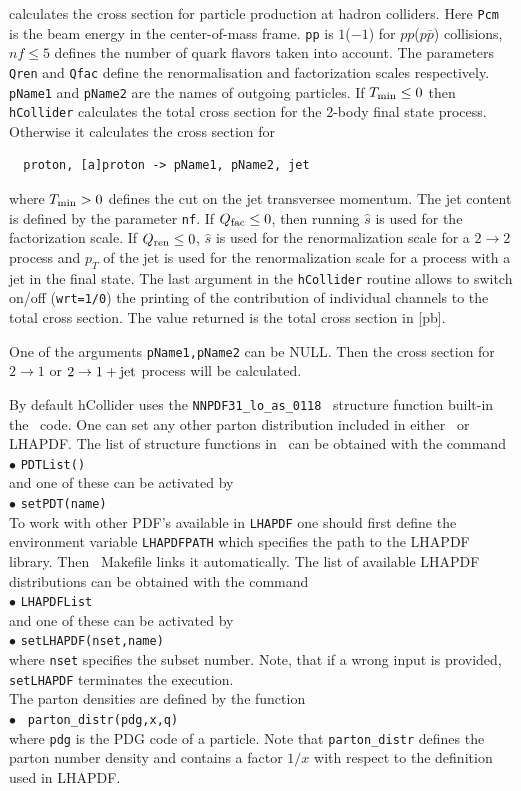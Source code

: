 \documentclass[12pt,a4paper]{article}
\begin{document}
calculates the cross
section for particle production at hadron colliders. Here \verb|Pcm| 
is the beam energy  in the center-of-mass frame. \verb|pp| is
$1$($-1$) for $pp$($p\bar{p}$) collisions, $ nf \le 5$  defines the
number of quark flavors taken into account.
The parameters  {\tt Qren} and  {\tt Qfac} define the renormalisation and factorization
 scales respectively. {\tt pName1} and {\tt pName2} are the names of outgoing
particles. If $T_{\rm min} \le 0 $ then {\tt hCollider} calculates the total  
cross section for the 2-body final state  process. Otherwise it calculates the cross
section for
\begin{verbatim}
  proton, [a]proton -> pName1, pName2, jet
\end{verbatim} 
where $ T_{\rm min}>0 $  defines the cut on the  jet transversee momentum. 
The jet content is defined by the  parameter \verb|nf|. 
If $Q_{\rm fac} \le 0 $, then  running  $\hat{s}$ is used for the
factorization  scale. If  $Q_{\rm ren} \le 0 $,  
$\hat{s}$ is used for the renormalization scale for a $2\to2$ process and $p_{T}$ of the jet is used for the renormalization scale for a process with a jet in the final state.
The last argument in the  {\tt hCollider} routine allows to switch
on/off ({\tt wrt=1/0}) the printing  of the contribution of individual channels to the total
cross section.   The value returned  is the total  cross section in [pb]. 


One of the arguments \verb|pName1,pName2| can be NULL. Then the cross section for $2\to1$   or $2\to1 + {\rm jet}$
process will be calculated. 

By default hCollider uses the \verb|NNPDF31_lo_as_0118|~\cite{Ball:2017nwa} structure function built-in
the \micro\ code. One can set any other parton distribution included in
either \micro\ or LHAPDF.  The list  of structure functions in \micro\ can be
obtained with the command \\
$\bullet$ \verb|PDTList()| \\
and one of these can be activated by\\ 
$\bullet$ \verb|setPDT(name)|\\
To work with other PDF's available in {\tt LHAPDF}  one should first define the environment
variable {\tt LHAPDFPATH}  which specifies the path to the LHAPDF library. Then
\micro\ Makefile  links it automatically. The list of available LHAPDF
distributions can be obtained with the command\\
$\bullet$ \verb|LHAPDFList|\\
and one of these can be activated by \\
$\bullet$ \verb|setLHAPDF(nset,name)|\\
where {\tt nset} specifies the subset number. Note, that if a wrong input is provided, 
\verb|setLHAPDF| terminates the execution.\\[2mm]
%
\noindent
The parton densities are  defined  by the function \\
$\bullet$ \verb| parton_distr(pdg,x,q)|\\
where {\tt pdg} is the PDG code of a particle. Note that \verb|parton_distr| defines the parton number density and  
contains a factor $1/x$  with respect to the  definition used in LHAPDF.  
\end{document}
